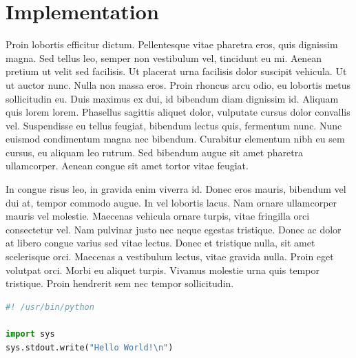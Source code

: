 \documentclass{article}
\begin{document}


\section{Implementation}

Proin lobortis efficitur dictum. Pellentesque vitae pharetra eros, quis dignissim magna. Sed tellus leo, semper non vestibulum vel, tincidunt eu mi. Aenean pretium ut velit sed facilisis. Ut placerat urna facilisis dolor suscipit vehicula. Ut ut auctor nunc. Nulla non massa eros. Proin rhoncus arcu odio, eu lobortis metus sollicitudin eu. Duis maximus ex dui, id bibendum diam dignissim id. Aliquam quis lorem lorem. Phasellus sagittis aliquet dolor, vulputate cursus dolor convallis vel. Suspendisse eu tellus feugiat, bibendum lectus quis, fermentum nunc. Nunc euismod condimentum magna nec bibendum. Curabitur elementum nibh eu sem cursus, eu aliquam leo rutrum. Sed bibendum augue sit amet pharetra ullamcorper. Aenean congue sit amet tortor vitae feugiat.

In congue risus leo, in gravida enim viverra id. Donec eros mauris, bibendum vel dui at, tempor commodo augue. In vel lobortis lacus. Nam ornare ullamcorper mauris vel molestie. Maecenas vehicula ornare turpis, vitae fringilla orci consectetur vel. Nam pulvinar justo nec neque egestas tristique. Donec ac dolor at libero congue varius sed vitae lectus. Donec et tristique nulla, sit amet scelerisque orci. Maecenas a vestibulum lectus, vitae gravida nulla. Proin eget volutpat orci. Morbi eu aliquet turpis. Vivamus molestie urna quis tempor tristique. Proin hendrerit sem nec tempor sollicitudin.

\begin{file}[hello.py]
\begin{lstlisting}[language=Python]
#! /usr/bin/python

import sys
sys.stdout.write("Hello World!\n")
\end{lstlisting}
\end{file}
\end{document}
